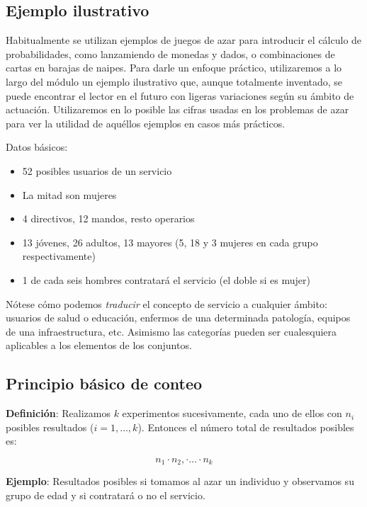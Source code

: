 \documentclass[
]{book}
\begin{document}
\hypertarget{ejemplo-ilustrativo}{%
\subsection{Ejemplo ilustrativo}\label{ejemplo-ilustrativo}}

Habitualmente se utilizan ejemplos de juegos de azar para introducir el
cálculo de probabilidades, como lanzamiendo de monedas y dados, o
combinaciones de cartas en barajas de naipes. Para darle un enfoque
práctico, utilizaremos a lo largo del módulo un ejemplo ilustrativo que,
aunque totalmente inventado, se puede encontrar el lector
en el futuro con ligeras variaciones según su ámbito de actuación.
Utilizaremos en lo posible las cifras usadas en los problemas de azar
para ver la utilidad de aquéllos ejemplos en casos más prácticos.

Datos básicos:

\begin{itemize}
\item
  52 posibles usuarios de un servicio
\item
  La mitad son mujeres
\item
  4 directivos, 12 mandos, resto operarios
\item
  13 jóvenes, 26 adultos, 13 mayores (5, 18 y 3 mujeres en cada
  grupo respectivamente)
\item
  1 de cada seis hombres contratará el servicio (el doble si es mujer)
\end{itemize}

Nótese cómo podemos \emph{traducir} el concepto de
servicio a cualquier ámbito: usuarios de salud o educación, enfermos de
una determinada patología, equipos de una infraestructura, etc. Asimismo
las categorías pueden ser cualesquiera aplicables a los elementos de los
conjuntos.

\hypertarget{principio-buxe1sico-de-conteo}{%
\subsection{Principio básico de conteo}\label{principio-buxe1sico-de-conteo}}

\textbf{Definición}: Realizamos \(k\) experimentos sucesivamente, cada
uno de ellos con \(n_i\) posibles resultados (\(i=1, \ldots, k\)). Entonces
el número total de resultados posibles es:

\[n_1\cdot n_2, \cdot \ldots \cdot n_k\]

\textbf{Ejemplo}: Resultados posibles si tomamos al azar un individuo
y observamos su grupo de edad y si contratará o no el servicio.
\end{document}
